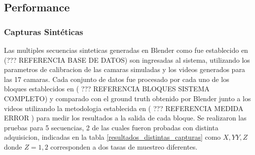 \subsection{Performance}

\subsubsection{Capturas Sintéticas}

Las multiples secuencias sinteticas generadas en Blender como fue establecido en (??? REFERENCIA BASE DE DATOS) son ingresadas al sistema, utilizando los parametros de calibracion de las camaras simuladas y los videos generados para las 17 camaras. Cada conjunto de datos fue procesado por cada uno de los bloques establecidos en ( ??? REFERENCIA BLOQUES SISTEMA COMPLETO) y comparado con el ground truth obtenido por Blender junto a los videos utilizando la metodologia establecida en ( ??? REFERENCIA MEDIDA ERROR ) para medir los resultados a la salida de cada bloque. Se realizaron las pruebas para 5 secuencias, 2 de las cuales fueron probadas con distinta adquisicion, indicadas en la tabla \ref{resultados_distintas_capturas} como $X,YY,Z$ donde $Z=1,2$ corresponden a dos tasas de muestreo diferentes.

